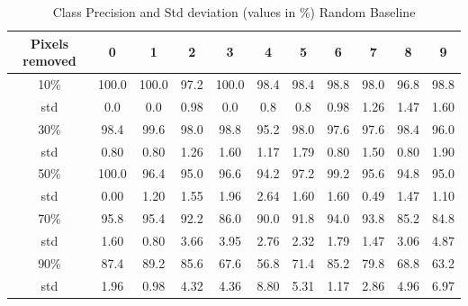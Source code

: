 \documentclass[conference]{IEEEtran}
\begin{document}
\begin{table}[h]
	\centering
	\begin{tabular}{|c|c|c|c|c|c|c|c|c|c|c|}
		\hline
		
		Pixels removed & 0 & 1 & 2 & 3 & 4 & 5 & 6 & 7 & 8 & 9 \\
		\hline
		10\%& 100.0 & 100.0 & 97.2 & 100.0 & 98.4 & 98.4 & 98.8 & 98.0 & 96.8 & 98.8 \\
		std & 0.0 & 0.0 & 0.98 & 0.0 & 0.8 & 0.8 & 0.98 & 1.26 & 1.47 & 1.60 \\ 
		\hline
		30\% &  98.4 & 99.6 & 98.0 & 98.8 & 95.2 & 98.0 & 97.6 & 97.6 & 98.4 & 96.0 \\
		std & 0.80 & 0.80 & 1.26 & 1.60 & 1.17 & 1.79 & 0.80 & 1.50 & 0.80 & 1.90 \\
		\hline
		50\% &100.0 & 96.4 & 95.0 & 96.6 & 94.2 & 97.2 & 99.2 & 95.6 & 94.8 & 95.0 \\
		std & 0.00 & 1.20 & 1.55 & 1.96 & 2.64 & 1.60 & 1.60 & 0.49 & 1.47 & 1.10 \\
		\hline
		70\% & 95.8 & 95.4 & 92.2 & 86.0 & 90.0 & 91.8 & 94.0 & 93.8 & 85.2 & 84.8 \\
		std & 1.60 & 0.80 & 3.66 & 3.95 & 2.76 & 2.32 & 1.79 & 1.47 & 3.06 & 4.87 \\
		\hline
		90\% & 87.4 & 89.2 & 85.6 & 67.6 & 56.8 & 71.4 & 85.2 & 79.8 & 68.8 & 63.2  \\
		std & 1.96 & 0.98 & 4.32 & 4.36 & 8.80 & 5.31 & 1.17 & 2.86 & 4.96 & 6.97 \\
		\hline
	\end{tabular} \newline
	
	\caption{Class Precision and Std deviation (values in \%) Random Baseline}
	\label{tab:sclass_accuracy_random}
\end{table}


\vspace{12pt}
\color{red}
\end{document}
